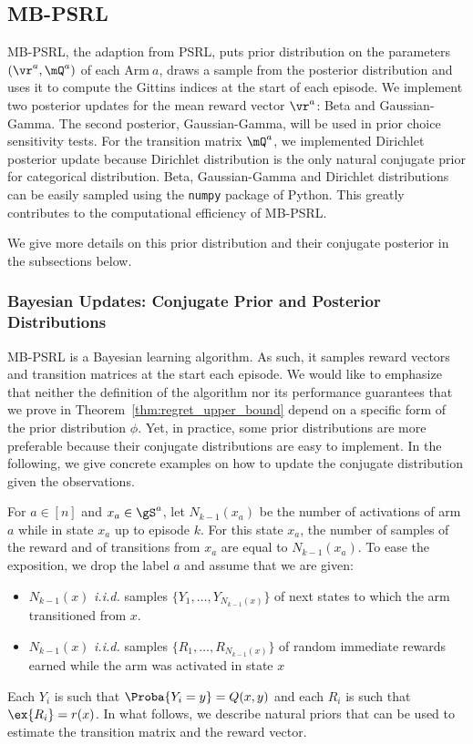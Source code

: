 \begin{subappendices}
\subsection{MB-PSRL}
\label{sssec:impl_gittinsPS}

MB-PSRL, the adaption from PSRL, puts prior distribution on the parameters $(\vr^a,\mQ^a)$ of each Arm$~a$, draws a sample from the posterior distribution and uses it to compute the Gittins indices at the start of each episode. We implement two posterior updates for the mean reward vector $\vr^a$: Beta and Gaussian-Gamma. The second posterior, Gaussian-Gamma, will be used in prior choice sensitivity tests. For the transition matrix $\mQ^a$, we implemented Dirichlet posterior update because Dirichlet distribution is the only natural conjugate prior for categorical distribution. Beta, Gaussian-Gamma and Dirichlet distributions can be easily sampled using the \texttt{numpy} package of Python. This greatly contributes to the computational efficiency of MB-PSRL.

We give more details on this prior distribution and their conjugate posterior in the subsections below.

\subsubsection{Bayesian Updates: Conjugate Prior and Posterior Distributions}
\label{apx:Bayes}

MB-PSRL is a Bayesian learning algorithm. 
As such, it samples reward vectors and transition matrices at the start each episode.
We would like to emphasize that neither the definition of the algorithm nor its performance guarantees that we prove in Theorem~\ref{thm:regret_upper_bound} depend on a specific form of the prior distribution $\phi$. 
Yet, in practice, some prior distributions are more preferable because their conjugate distributions are easy to implement. 
In the following, we give concrete examples on how to update the conjugate distribution given the observations. 

For $a\in[n]$ and $x_a\in\gS^a$, let $N_{k-1}(x_a)$ be the number of activations of arm $a$ while in state $x_a$ up to episode $k$. 
For this state $x_a$, the number of samples of the reward and of transitions from $x_a$ are equal to $N_{k-1}(x_a)$. 
To ease the exposition, we drop the label $a$ and assume that we are given: 
\begin{itemize}
    \item $N_{k-1}(x)$ \emph{i.i.d.} samples $\{Y_1,\dots,Y_{N_{k-1}(x)}\}$ of next states to which the arm transitioned from $x$.
    \item $N_{k-1}(x)$ \emph{i.i.d.} samples $\{R_1,\dots,R_{N_{k-1}(x)}\}$ of random immediate rewards earned while the arm was activated in state $x$
\end{itemize}
Each $Y_i$ is such that $\Proba{Y_i=y}=Q(x,y)$ and each $R_i$ is such that $\ex{R_i}=r(x)$. In what follows, we describe natural priors that can be used to estimate the transition matrix and the reward vector. 


\end{subappendices}
